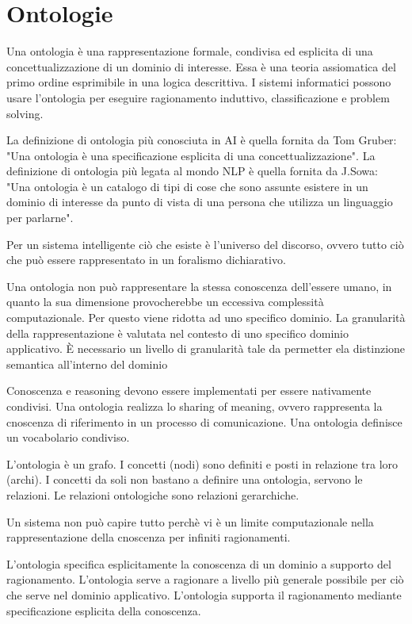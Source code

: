 \chapter{Ontologie}
\label{chp:ontologies}

Una ontologia è una rappresentazione formale, condivisa ed esplicita di una concettualizzazione di un dominio di interesse.
Essa è una teoria assiomatica del primo ordine esprimibile in una logica descrittiva.
I sistemi informatici possono usare l'ontologia per eseguire ragionamento induttivo, classificazione e problem solving.

La definizione di ontologia più conosciuta in AI è quella fornita da Tom Gruber: "Una ontologia è una specificazione esplicita di una concettualizzazione".
La definizione di ontologia più legata al mondo NLP è quella fornita da J.Sowa: "Una ontologia è un catalogo di tipi di cose che sono assunte esistere in un dominio di interesse da punto di vista di una persona che utilizza un linguaggio per parlarne".

Per un sistema intelligente ciò che esiste è l'universo del discorso, ovvero tutto ciò che può essere rappresentato in un foralismo dichiarativo.

Una ontologia non può rappresentare la stessa conoscenza dell'essere umano, in quanto la sua dimensione provocherebbe un eccessiva complessità computazionale. Per questo viene ridotta ad uno specifico dominio. La granularità della rappresentazione è valutata nel contesto di uno specifico dominio applicativo. È necessario un livello di granularità tale da permetter ela distinzione semantica all'interno del dominio

Conoscenza e reasoning devono essere implementati per essere nativamente condivisi. Una ontologia realizza lo sharing of meaning, ovvero rappresenta la cnoscenza di riferimento in un processo di comunicazione. Una ontologia definisce un vocabolario condiviso.

L'ontologia è un grafo. I concetti (nodi) sono definiti e posti in relazione tra loro (archi). I concetti da soli non bastano a definire una ontologia, servono le relazioni. Le relazioni ontologiche sono relazioni gerarchiche.

Un sistema non può capire tutto perchè vi è un limite computazionale nella rappresentazione della cnoscenza per infiniti ragionamenti.

L'ontologia specifica esplicitamente la conoscenza di un dominio a supporto del ragionamento.
L'ontologia serve a ragionare a livello più generale possibile per ciò che serve nel dominio applicativo.
L'ontologia supporta il ragionamento mediante specificazione esplicita della conoscenza.


